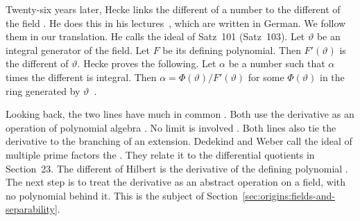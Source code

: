 Twenty-six years later, Hecke links the different of a number to the different
of the field \cite{Hecke1923}. He does this in his lectures~\cite{Hecke1923},
which are written in German. We follow them in our translation. He calls the
ideal of Satz~101  (Satz~103).
Let $\vartheta$ be an integral generator of the field. Let $F$ be its defining
polynomial. Then $F'(\vartheta)$ is the different of $\vartheta$. Hecke proves
the following. Let $\alpha$ be a number such that $\alpha$ times the different
is integral. Then $\alpha = \Phi(\vartheta)/F'(\vartheta)$ for some
$\Phi(\vartheta)$ in the ring generated by $\vartheta$~\cite[\S 36,
pp.~133--134]{Hecke1923}.

Looking back, the two lines have much in common \cite[\S 11,
p.~226]{DedekindWeber1882}. Both use the derivative as an operation of
polynomial algebra \cite[\S 11, p.~226]{DedekindWeber1882}. No limit is
involved \cite[\S 11, p.~226]{DedekindWeber1882}. Both lines also tie the
derivative to the branching of an extension. Dedekind and Weber call the ideal
of multiple prime factors the  \cite[\S 11, p.~226]{DedekindWeber1882}.
They relate it to the differential quotients in Section~23. The different of
Hilbert is the derivative of the defining polynomial
\cite[\S 3, p.~179]{Hilbert1897}. The next step is to treat the derivative as
an abstract operation on a field, with no polynomial
behind it. This is the subject of
Section~\ref{sec:origins:fields-and-separability}.
